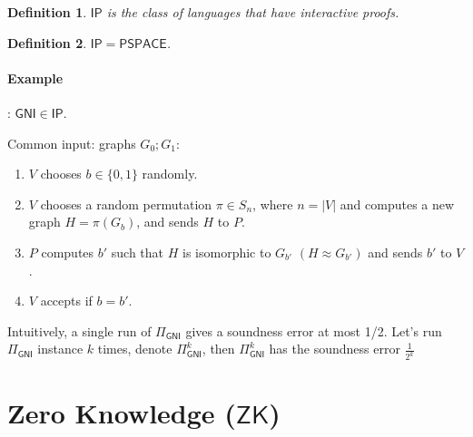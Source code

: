 \documentclass[11pt]{article}
\newcommand{\class}[1]{{\ensuremath{\mathsf{#1}}}}
\newcommand{\ip}{\class{IP}}
\newcommand{\zk}{\class{ZK}}
\newcommand{\gni}{\class{GNI}}
\newcommand{\zo}{\{0, 1\}}
\newtheorem{definition}{Definition}[section]
\begin{document}
\begin{definition}
$\ip$ is the class of languages that have interactive proofs.
\end{definition}
\begin{definition}
$\ip = \class{PSPACE}$.
\end{definition}

\paragraph{Example}: $\class{GNI} \in \ip$.

Common input: graphs $G_0; G_1$:
\begin{enumerate}
\item $V$ chooses $b\in \zo$ randomly.
\item $V$ chooses a random permutation $\pi\in S_n$, where $n = |V|$ and computes a new graph $H = \pi(G_{b})$, and sends $H$ to $P$.
\item $P$ computes $b'$ such that $H$ is isomorphic to $G_{b'}$ $(H \approx G_{b'})$ and sends $b'$ to $V$ .
\item $V$ accepts if $b = b'$.
\end{enumerate}
Intuitively, a single run of $\Pi_\gni$ gives a soundness error at most 1/2. Let's run $\Pi_\gni$ instance $k$ times, denote $\Pi_\gni^k$, then $\Pi_\gni^k$ has the soundness error $\frac{1}{2^k}$



\section{Zero Knowledge ($\zk$)}
\end{document}
